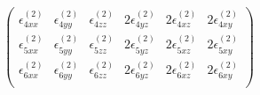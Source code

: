 \begin{equation*}
\begin{pmatrix}
\epsilon_{4xx}^{\left(2\right)}&\epsilon_{4yy}^{\left(2\right)}&\epsilon_{4zz}^{\left(2\right)}&2\epsilon_{4yz}^{\left(2\right)}&2\epsilon_{4xz}^{\left(2\right)}&2\epsilon_{4xy}^{\left(2\right)} \\
\epsilon_{5xx}^{\left(2\right)}&\epsilon_{5yy}^{\left(2\right)}&\epsilon_{5zz}^{\left(2\right)}&2\epsilon_{5yz}^{\left(2\right)}&2\epsilon_{5xz}^{\left(2\right)}&2\epsilon_{5xy}^{\left(2\right)} \\
\epsilon_{6xx}^{\left(2\right)}&\epsilon_{6yy}^{\left(2\right)}&\epsilon_{6zz}^{\left(2\right)}&2\epsilon_{6yz}^{\left(2\right)}&2\epsilon_{6xz}^{\left(2\right)}&2\epsilon_{6xy}^{\left(2\right)} \\
\end{pmatrix} 
\end{equation*}

